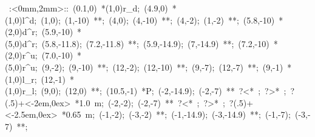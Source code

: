 \hbox{
\xy    <2mm,0mm>:<0mm,2mm>::
       (0.1,0) *\cir(1,0){r_d}; 
	   (4.9,0) *\cir(1,0){l^d}; 
	   (1,0); (1,-10) **\dir{-}; 
	   (4,0); (4,-10) **\dir{-};   %
	   (4,-2); (1,-2) **\dir{-}; 
	   (5.8,-10) *\cir(2,0){d^r}; %
	   (5.9,-10) *\cir(5,0){d^r}; 
	   (5.8,-11.8); (7.2,-11.8) **\dir{-}; 
	   (5.9,-14.9); (7,-14.9) **\dir{-}; 
	   (7.2,-10) *\cir(2,0){r^u}; 
	   (7.0,-10) *\cir(5,0){r^u}; 
	   (9,-2); (9,-10) **\dir{-}; 
	   (12,-2); (12,-10) **\dir{-}; 
	   (9,-7); (12,-7) **\dir{-}; 
	   (9,-1) *\cir(1,0){l_r};
	   (12,-1) *\cir(1,0){r_l};
	   (9,0); (12,0) **\dir{-};
	   (10.5,-1) *{P};             %
	   (-2,-14.9); (-2,-7) **\dir{-} ?<* \dir{<}; ?>* \dir{>}; 
	   ?(.5)+<-2em,0ex> *{\hbox{1.0 m}};
	   (-2,-2); (-2,-7) **\dir{-} ?<* \dir{<}; ?>* \dir{>};
	   ?(.5)+<-2.5em,0ex> *{\hbox{0.65 m}};
	   (-1,-2); (-3,-2) **\dir{-};
	   (-1,-14.9); (-3,-14.9) **\dir{-};
	   (-1,-7); (-3,-7) **\dir{-};
	   \endxy}
